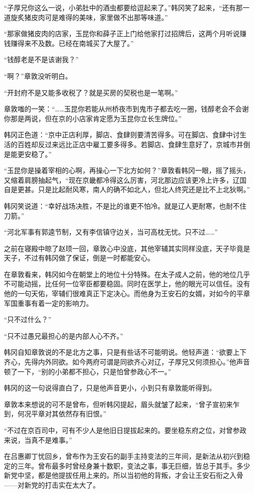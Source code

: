 “子厚兄你这么一说，小弟肚中的酒虫都要给逗起来了。”韩冈笑了起来，“还有那一道旋炙猪皮肉可是难得的美味，家里做不出那等味道。”

“那家做猪皮肉的店家，玉昆你和薛子正上门给他家打过招牌后，这两个月听说赚钱赚得来不及数。已经在南城买了大屋了。”

“钱醇老是不是该谢我？”

“啊？”章敦没听明白。

“开封府不是又能多收税了？就是买房的契税也是一笔啊。”

章敦嗤的一笑：“……玉昆你若能从州桥夜市到鬼市子都去吃一圈，钱醇老会不会谢你那是两说，但在京的小店家肯定愿为玉昆你立长生牌位。”

韩冈正色道：“京中正店利厚，脚店、食肆则要清苦得多。可在脚店、食肆中讨生活的百姓却反过来远比正店中雇工要多得多。若脚店、食肆生意好了，京城市井倒是能更安稳了。”

“玉昆你是操着宰相的心啊，再操心一下北方如何？”章敦看韩冈一眼，摇了摇头，又缩着肩膀抽起气，“现在京畿都冷得这么厉害，河北那边应该更冷上许多，辽国自是更甚。只是比起耐风寒，南人的确不如北人，但北人终究还是比不上北狄啊。”

韩冈笑说道：“幸好战场决胜，不是比的谁更不怕冷。就是辽人更耐寒，也耐不住刀箭。”

“河北军事有郭逵节制，又有李信镇守边关，当可高枕无忧。只不过……”

之前在寝殿中晾了赵顼一回，章敦心中没底，其他宰辅其实同样没底，天子毕竟是天子，不过有韩冈做了保证，倒是一时都能安心。

在章敦看来，韩冈如今在朝堂上的地位十分特殊。在太子成人之前，他的地位几乎不可能动摇，比任何一位宰臣都要稳固。同时在医学上，他的眼光可以信任。没有他的一句天佑，宰辅们很难真正下定决心。而他身为王安石的女婿，对如今的平章军国重事有着一定的影响力。

“只不过什么？”

“只不过愚兄最担心的是内部人心不齐。”

韩冈自知章敦说的不是北方之事，只是有些话不可能明说。他轻声道：“欲要上下齐心，先得内外同欲。如今两府可谓是同欲齐心对辽，子厚兄又何须担心。”他声音顿了一下，“别的小弟都不担心，只是怕曾参政心不一。”

韩冈的这一句说得直白了，只是他声音更小，小到只有章敦能听得到。

章敦本来想说的可不是曾布，但听韩冈提起，眉头就皱了起来，“曾子宣初来乍到，何况平章对其依然存有旧恨。”

“不过在京百司中，可有不少人是他旧日提拔起来的。要坐稳东府之位，对曾参政来说，当真不是难事。”

在吕惠卿丁忧回乡，曾布作为王安石的副手主持变法的三年间，是新法从初兴到稳定的三年。曾布最多时曾经身兼十数职，变法之事，事无巨细，皆总于其手。多少新党中坚，都是他提拔任用上来的。所以当初他的背叛，才会让王安石衔之入骨——对新党的打击实在太大了。

